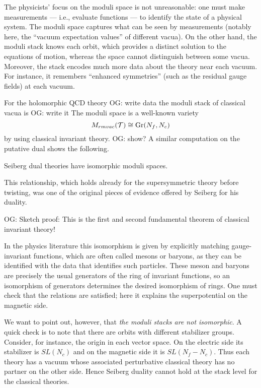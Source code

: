 \documentclass[11pt]{amsart}
\def\owen#1{{\textcolor{violet!65!black}{OG: {#1}}}}
\begin{document}
\begin{rmk}
The physicists' focus on the moduli space is not unreasonable:
one must make measurements --- i.e., evaluate functions --- to identify the state of a physical system.
The moduli space captures what can be seen by measurements (notably here, the ``vacuum expectation values'' of different vacua).
On the other hand, the moduli stack knows each orbit, which provides a distinct solution to the equations of motion, whereas the space cannot distinguish between some vacua.
Moreover, the stack encodes much more data about the theory near each vacuum.
For instance, it remembers ``enhanced symmetries'' (such as the residual gauge fields) at each vacuum.
\end{rmk}

For the holomorphic QCD theory \owen{write data} the moduli stack of classical vacua is \owen{write it}
The moduli space is a well-known variety
\[
M_{rm vac}(\mathcal T) \cong {\rm Gr}(N_f, N_c)
\]
by using classical invariant theory. \owen{show?}
A similar computation on the putative dual shows the following.

\begin{prop}
Seiberg dual theories have isomorphic moduli spaces.
\end{prop}

This relationship, which holds already for the supersymmetric theory before twisting, was one of the original pieces of evidence offered by Seiberg for his duality.

\owen{Sketch proof}: This is the first and second fundamental theorem of classical invariant theory!

\begin{rmk}
In the physics literature this isomorphism is given by explicitly matching gauge-invariant functions, which are often called mesons or baryons, as they can be identified with the data that identifies such particles.
These meson and baryons are precisely the usual generators of the ring of invariant functions, so an isomorphism of generators determines the desired isomorphism of rings. 
One must check that the relations are satisfied;
here it explains the superpotential on the magnetic side.
\end{rmk}

We want to point out, however, that {\em the moduli stacks are not isomorphic}.
A quick check is to note that there are orbits with different stabilizer groups.
Consider, for instance, the origin in each vector space.
On the electric side its stabilizer is $SL(N_c)$ and on the magnetic side it is $SL(N_f - N_c)$.
Thus each theory has a vacuum whose associated perturbative classical theory has no partner on the other side.
Hence Seiberg duality cannot hold at the stack level for the classical theories.
\end{document}
